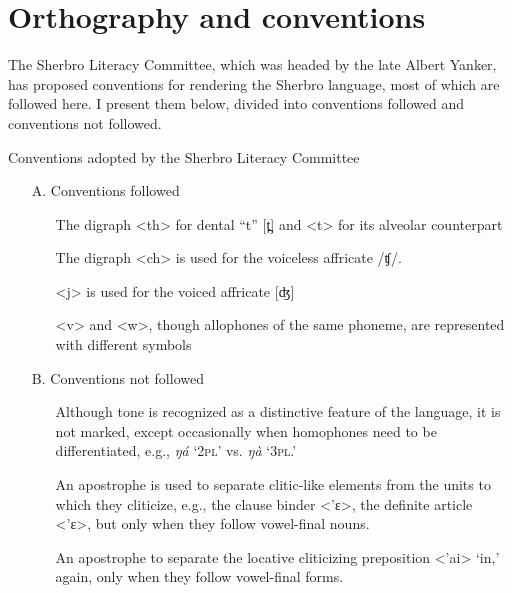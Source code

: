 \section{Orthography and conventions}
\label{sec:1.9}\hypertarget{Toc115517751}{}
The Sherbro Literacy Committee, which was headed by the late Albert Yanker, has proposed conventions for rendering the Sherbro language, most of which are followed here. I present them below, divided into conventions followed and conventions not followed.

\ea%
\label{ex:9}
Conventions adopted by the Sherbro Literacy Committee\\
\begin{itemize}
    \item[A.] Conventions followed\\
\begin{itemize}
\item[]The digraph <th> for dental “t” [t̪] and <t> for its alveolar counterpart

\item[]The digraph <ch> is used for the voiceless affricate /ʧ/.

\item[]<j> is used for the voiced affricate [ʤ]

\item[]<v> and <w>, though allophones of the same phoneme, are represented with different symbols
\end{itemize}

\item[B.] Conventions not followed\\
\begin{itemize}
\item[]Although tone is recognized as a distinctive feature of the language, it is not marked, except occasionally when homophones need to be differentiated, e.g., \textit{ŋá} ‘2\textsc{pl}' vs. \textit{ŋà} ‘3\textsc{pl}.'

\item[]An apostrophe is used to separate clitic-like elements from the units to which they cliticize, e.g., the clause binder <'ɛ>, the definite article <'ɛ>, but only when they follow vowel-final nouns.

\item[]An apostrophe to separate the locative cliticizing preposition <'ai> ‘in,' again, only when they follow vowel-final forms.
\end{itemize}
\end{itemize}
\z



